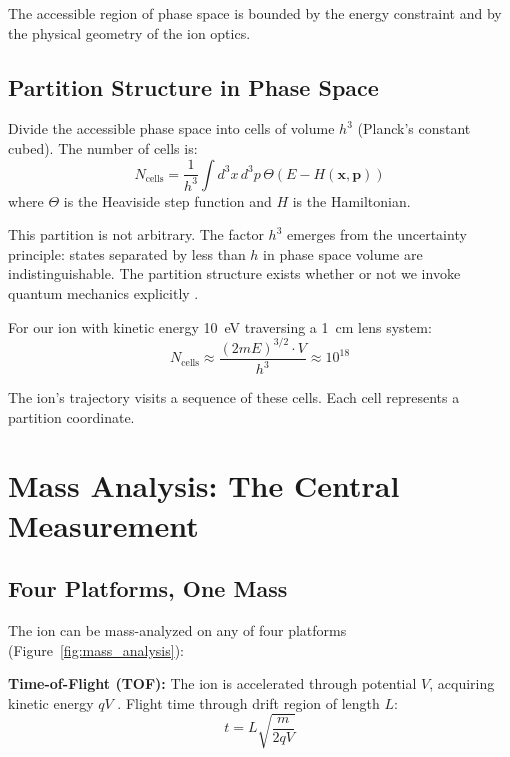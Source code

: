 \documentclass[twocolumn,10pt]{article}
\theoremstyle{remark}
\begin{document}
The accessible region of phase space is bounded by the energy constraint and by the physical geometry of the ion optics.

\subsection{Partition Structure in Phase Space}

Divide the accessible phase space into cells of volume $h^3$ (Planck's constant cubed). The number of cells is:
\begin{equation}
N_{\text{cells}} = \frac{1}{h^3} \int d^3x \, d^3p \, \Theta(E - H(\mathbf{x}, \mathbf{p}))
\end{equation}
where $\Theta$ is the Heaviside step function and $H$ is the Hamiltonian.

This partition is not arbitrary. The factor $h^3$ emerges from the uncertainty principle: states separated by less than $h$ in phase space volume are indistinguishable. The partition structure exists whether or not we invoke quantum mechanics explicitly \cite{landau1980statistical,gibbs1902elementary}.

For our ion with kinetic energy 10~eV traversing a 1~cm lens system:
\begin{equation}
N_{\text{cells}} \approx \frac{(2mE)^{3/2} \cdot V}{h^3} \approx 10^{18}
\end{equation}

The ion's trajectory visits a sequence of these cells. Each cell represents a partition coordinate.


\section{Mass Analysis: The Central Measurement}
\label{sec:mass-analysis}

\subsection{Four Platforms, One Mass}

The ion can be mass-analyzed on any of four platforms (Figure~\ref{fig:mass_analysis}):

\textbf{Time-of-Flight (TOF):} The ion is accelerated through potential $V$, acquiring kinetic energy $qV$ \cite{mamyrin1973reflection}. Flight time through drift region of length $L$:
\begin{equation}
t = L \sqrt{\frac{m}{2qV}}
\end{equation}
\end{document}
